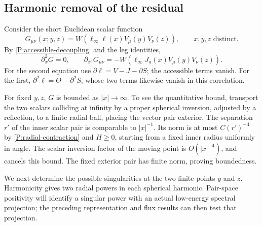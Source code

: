 \subsection{Harmonic removal of the residual}

Consider the short Euclidean scalar function
\begin{equation}
 G_{\mu\nu}(x;y,z)
   =W(\ell_\infty\ell(x)V_\mu(y)V_\nu(z)),
 \qquad x,y,z\text{ distinct}.
 \label{P:G-definition}
\end{equation}
By \eqref{P:accessible-decoupling} and the leg identities,
\begin{equation}
 \partial_x^2G=0,\qquad
 \partial_{x^a}G_{\mu\nu}
       =-W(\ell_\infty J_a(x)V_\mu(y)V_\nu(z)).
 \label{P:G-harmonic}
\end{equation}
For the second equation use
$\partial\ell=V-J-\partial S$; the accessible terms vanish.
For the first, $\partial^2\ell=\Theta-\partial^2S$, whose two
terms likewise vanish in this correlation.

For fixed $y,z$, $G$ is bounded as $|x|\to\infty$.
To see the quantitative bound, transport the two scalars colliding
at infinity by a proper spherical inversion, adjusted by a reflection,
to a finite radial ball, placing the vector pair exterior.  The
separation $r'$ of the inner scalar pair is comparable to $|x|^{-1}$.
Its norm is at most $C(r')^{-4}$ by
\eqref{P:radial-contraction} and $H\geq0$, starting from a fixed
inner radius uniformly in angle.  The scalar inversion factor of the
moving point is $O(|x|^{-4})$, and cancels this bound.  The fixed
exterior pair has finite norm, proving boundedness.

We next determine the possible singularities at the two finite
points $y$ and $z$.  Harmonicity gives two radial powers in each
spherical harmonic.  Pair-space positivity will identify a singular
power with an actual low-energy spectral projection; the preceding
representation and flux results can then test that projection.

